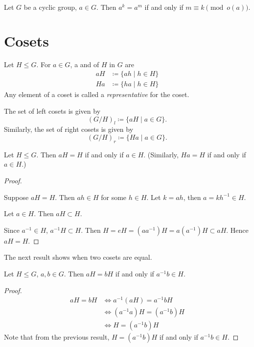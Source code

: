 \begin{corollary}
Let $G$ be a cyclic group, $a\in G$. Then $a^k=a^m$ if and only if $m\equiv k\pmod{o(a)}$.
\end{corollary}
\pagebreak

\section{Cosets}
\begin{definition}[Coset]
Let $H\le G$. For $a\in G$, a  and  of $H$ in $G$ are
\begin{align*}
aH&\coloneqq\{ah\mid h\in H\}\\
Ha&\coloneqq\{ha\mid h\in H\}
\end{align*}
Any element of a coset is called a \emph{representative} for the coset.
\end{definition}

The set of left cosets is given by
\[(G/H)_{l}\coloneqq\{aH\mid a\in G\}.\]
Similarly, the set of right cosets is given by
\[(G/H)_{r}\coloneqq\{Ha\mid a\in G\}.\]

\begin{lemma}
Let $H\le G$. Then $aH=H$ if and only if $a\in H$. (Similarly, $Ha=H$ if and only if $a\in H$.)
\end{lemma}

\begin{proof} \

\fbox{$\implies$} Suppose $aH=H$. Then $ah\in H$ for some $h\in H$. Let $k=ah$, then $a=kh^{-1}\in H$.

\fbox{$\impliedby$} Let $a\in H$. Then $aH\subset H$.

Since $a^{-1}\in H$, $a^{-1}H\subset H$. Then $H=eH=(aa^{-1})H=a(a^{-1})H\subset aH$. Hence $aH=H$.
\end{proof}

The next result shows when two cosets are equal.
\begin{lemma}
Let $H\le G$, $a,b\in G$. Then $aH=bH$ if and only if $a^{-1}b\in H$.
\end{lemma}

\begin{proof}
\begin{align*}
aH=bH&\iff a^{-1}(aH)=a^{-1}bH\\
&\iff (a^{-1}a)H=(a^{-1}b)H\\
&\iff H=(a^{-1}b)H
\end{align*}
Note that from the previous result, $H=(a^{-1}b)H$ if and only if $a^{-1}b\in H$.
\end{proof}

